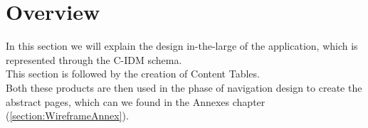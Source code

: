 \documentclass[../../DD.tex]{subfiles}
\begin{document}
\section{Overview}
	In this section we will explain the design in-the-large of the application, which is represented through the C-IDM schema.\\
    This section is followed by the creation of Content Tables.\\
    Both these products are then used in the phase of navigation design to create the abstract pages, which can we found in the Annexes chapter (\ref{section:WireframeAnnex}).\\
\end{document}
